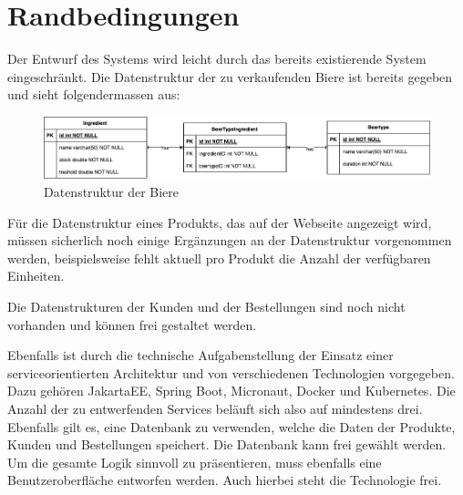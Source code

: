 
\section{Randbedingungen}
\label{sec:randbedingungen}
Der Entwurf des Systems wird leicht durch das bereits existierende System eingeschränkt. Die Datenstruktur der zu
verkaufenden Biere ist bereits gegeben und sieht folgendermassen aus:
\begin{figure}[H]
    \centering
    \includegraphics[width=1.0\textwidth]{../images/kontextabgrenzung/PA5-Datenstruktur.png}
    \caption{Datenstruktur der Biere}
    \label{fig:randbedingungen}
\end{figure}

Für die Datenstruktur eines Produkts, das auf der Webseite angezeigt wird, müssen sicherlich noch einige Ergänzungen an der
Datenstruktur vorgenommen werden, beispielsweise fehlt aktuell pro Produkt die Anzahl der verfügbaren Einheiten.

Die Datenstrukturen der Kunden und der Bestellungen sind noch nicht vorhanden und können frei gestaltet werden.

Ebenfalls ist durch die technische Aufgabenstellung der Einsatz einer serviceorientierten Architektur und von 
verschiedenen Technologien vorgegeben. Dazu gehören JakartaEE, Spring Boot, Micronaut, Docker und Kubernetes. 
Die Anzahl der zu entwerfenden Services beläuft sich also auf mindestens drei. Ebenfalls gilt es, eine Datenbank
zu verwenden, welche die Daten der Produkte, Kunden und Bestellungen speichert. Die Datenbank kann frei gewählt werden.
Um die gesamte Logik sinnvoll zu präsentieren, muss ebenfalls eine Benutzeroberfläche entworfen werden. Auch hierbei
steht die Technologie frei.
